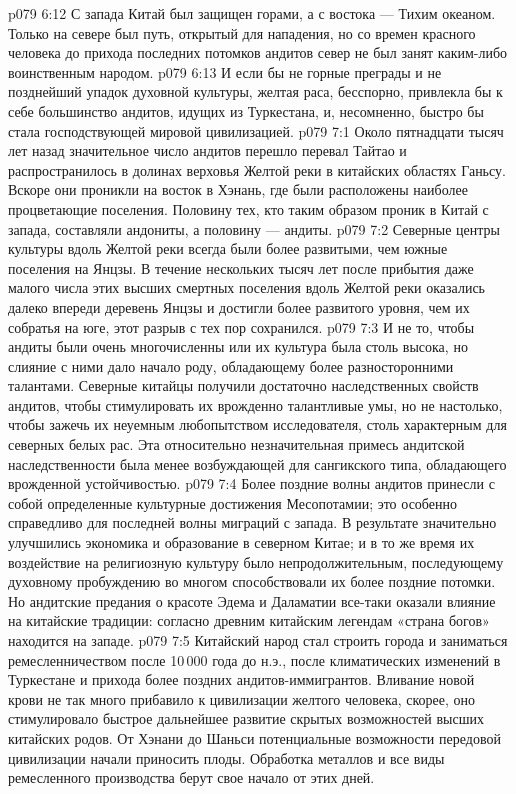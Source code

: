 \vs p079 6:12 \bibnobreakspace {} С запада Китай был защищен горами, а с востока --- Тихим океаном. Только на севере был путь, открытый для нападения, но со времен красного человека до прихода последних потомков андитов север не был занят каким\hyp{}либо воинственным народом.
\vs p079 6:13 И если бы не горные преграды и не позднейший упадок духовной культуры, желтая раса, бесспорно, привлекла бы к себе большинство андитов, идущих из Туркестана, и, несомненно, быстро бы стала господствующей мировой цивилизацией.
\vs p079 7:1 Около пятнадцати тысяч лет назад значительное число андитов перешло перевал Тайтао и распространилось в долинах верховья Желтой реки в китайских областях Ганьсу. Вскоре они проникли на восток в Хэнань, где были расположены наиболее процветающие поселения. Половину тех, кто таким образом проник в Китай с запада, составляли андониты, а половину --- андиты.
\vs p079 7:2 Северные центры культуры вдоль Желтой реки всегда были более развитыми, чем южные поселения на Янцзы. В течение нескольких тысяч лет после прибытия даже малого числа этих высших смертных поселения вдоль Желтой реки оказались далеко впереди деревень Янцзы и достигли более развитого уровня, чем их собратья на юге, этот разрыв с тех пор сохранился.
\vs p079 7:3 \pc И не то, чтобы андиты были очень многочисленны или их культура была столь высока, но слияние с ними дало начало роду, обладающему более разносторонними талантами. Северные китайцы получили достаточно наследственных свойств андитов, чтобы стимулировать их врожденно талантливые умы, но не настолько, чтобы зажечь их неуемным любопытством исследователя, столь характерным для северных белых рас. Эта относительно незначительная примесь андитской наследственности была менее возбуждающей для сангикского типа, обладающего врожденной устойчивостью.
\vs p079 7:4 \pc Более поздние волны андитов принесли с собой определенные культурные достижения Месопотамии; это особенно справедливо для последней волны миграций с запада. В результате значительно улучшились экономика и образование в северном Китае; и в то же время их воздействие на религиозную культуру было непродолжительным, последующему духовному пробуждению во многом способствовали их более поздние потомки. Но андитские предания о красоте Эдема и Даламатии все\hyp{}таки оказали влияние на китайские традиции: согласно древним китайским легендам «страна богов» находится на западе.
\vs p079 7:5 Китайский народ стал строить города и заниматься ремесленничеством после 10\,000 года до н.э., после климатических изменений в Туркестане и прихода более поздних андитов\hyp{}иммигрантов. Вливание новой крови не так много прибавило к цивилизации желтого человека, скорее, оно стимулировало быстрое дальнейшее развитие скрытых возможностей высших китайских родов. От Хэнани до Шаньси потенциальные возможности передовой цивилизации начали приносить плоды. Обработка металлов и все виды ремесленного производства берут свое начало от этих дней.

